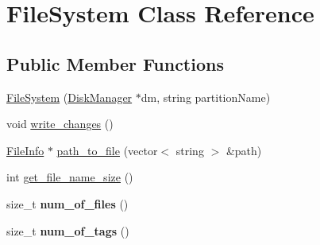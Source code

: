 \hypertarget{classFileSystem}{}\section{File\+System Class Reference}
\label{classFileSystem}
\subsection*{Public Member Functions}
\begin{DoxyCompactItemize}
\item 
\mbox{\hyperlink{classFileSystem_a1466c6d1e9636cecd44f0dd68ef710b5}{File\+System}} (\mbox{\hyperlink{classDiskManager}{Disk\+Manager}} $\ast$dm, string partition\+Name)
\item 
void \mbox{\hyperlink{classFileSystem_a02953b33b71137de70b8c8e48c59ff77}{write\+\_\+changes}} ()
\item 
\mbox{\hyperlink{classFileInfo}{File\+Info}} $\ast$ \mbox{\hyperlink{classFileSystem_a6c6e95f60417b02601b72e951e7108f8}{path\+\_\+to\+\_\+file}} (vector$<$ string $>$ \&path)
\item 
int \mbox{\hyperlink{classFileSystem_a0444400c1e30b7981123ba6991798c86}{get\+\_\+file\+\_\+name\+\_\+size}} ()
\item 
\mbox{\label{classFileSystem_abed8c3903751d882a668a2ced7d0f144}} 
size\+\_\+t {\bfseries num\+\_\+of\+\_\+files} ()
\item 
\mbox{\label{classFileSystem_ad5aa3ef11ac131718e7a2b7abb07f6ec}} 
size\+\_\+t {\bfseries num\+\_\+of\+\_\+tags} ()
\end{DoxyCompactItemize}
